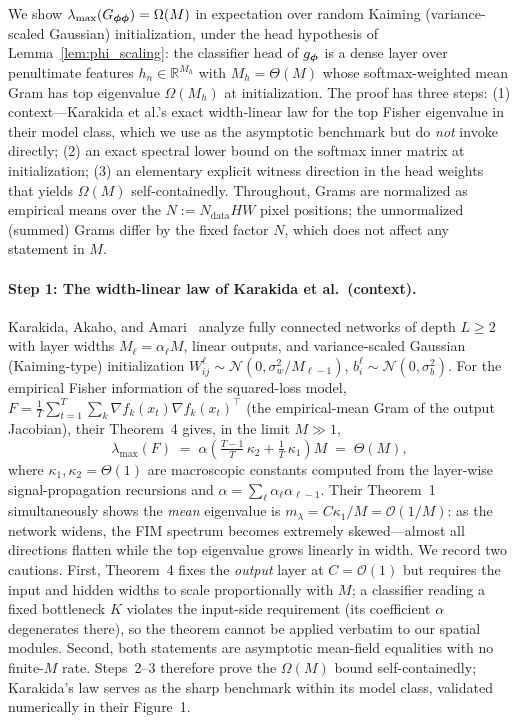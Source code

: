 We show $\lambda_{\max}(G_{{\boldsymbol{\phi}}{\boldsymbol{\phi}}}) = \Omega(M)$ in
expectation over random Kaiming (variance-scaled Gaussian)
initialization, under the head hypothesis of
Lemma~\ref{lem:phi_scaling}: the classifier head of $g_{\boldsymbol{\phi}}$ is a
dense layer over penultimate features $h_n \in \mathbb{R}^{M_h}$
with $M_h = \Theta(M)$ whose softmax-weighted mean Gram has top
eigenvalue $\Omega(M_h)$ at initialization. The proof has three
steps: (1) context---Karakida et al.'s exact width-linear law for
the top Fisher eigenvalue in their model class, which we use as the
asymptotic benchmark but do \emph{not} invoke directly; (2) an exact
spectral lower bound on the softmax inner matrix at initialization;
(3) an elementary explicit witness direction in the head weights
that yields $\Omega(M)$ self-containedly. Throughout, Grams are
normalized as empirical means over the
$N := N_{\mathrm{data}} HW$ pixel positions; the unnormalized
(summed) Grams differ by the fixed factor $N$, which does not affect
any statement in $M$.

\paragraph{Step 1: The width-linear law of Karakida et al.\ (context).}
Karakida, Akaho, and Amari~\cite{karakida2019universal} analyze fully
connected networks of depth $L \geq 2$ with layer widths
$M_\ell = \alpha_\ell M$, linear outputs, and variance-scaled Gaussian
(Kaiming-type) initialization
$W^\ell_{ij} \sim \mathcal{N}(0, \sigma_w^2 / M_{\ell-1})$,
$b^\ell_i \sim \mathcal{N}(0, \sigma_b^2)$. For the empirical Fisher
information of the squared-loss model,
$F = \tfrac{1}{T} \sum_{t=1}^{T} \sum_{k} \nabla f_k(x_t) \nabla
f_k(x_t)^\top$ (the empirical-mean Gram of the output Jacobian),
their Theorem~4 gives, in the limit $M \gg 1$,
\[
    \lambda_{\max}(F)
    \;=\; \alpha \left( \tfrac{T-1}{T}\,\kappa_2
        + \tfrac{1}{T}\,\kappa_1 \right) M
    \;=\; \Theta(M),
\]
where $\kappa_1, \kappa_2 = \Theta(1)$ are macroscopic constants
computed from the layer-wise signal-propagation recursions and
$\alpha = \sum_\ell \alpha_\ell \alpha_{\ell - 1}$. Their Theorem~1
simultaneously shows the \emph{mean} eigenvalue is
$m_\lambda = C \kappa_1 / M = \mathcal{O}(1/M)$: as the network
widens, the FIM spectrum becomes extremely skewed---almost all
directions flatten while the top eigenvalue grows linearly in width.
We record two cautions. First, Theorem~4 fixes the \emph{output}
layer at $C = \mathcal{O}(1)$ but requires the input and hidden
widths to scale proportionally with $M$; a classifier reading a
fixed bottleneck $K$ violates the input-side requirement (its
coefficient $\alpha$ degenerates there), so the theorem cannot be
applied verbatim to our
spatial modules. Second, both statements are asymptotic mean-field
equalities with no finite-$M$ rate. Steps~2--3 therefore prove the
$\Omega(M)$ bound self-containedly; Karakida's law serves as the
sharp benchmark within its model class, validated numerically in
their Figure~1.


